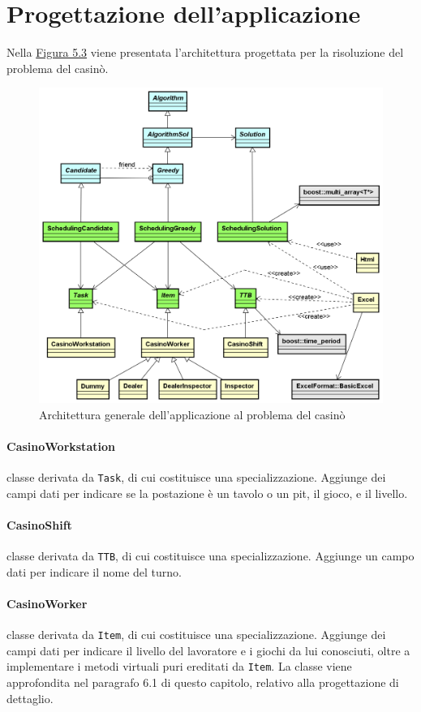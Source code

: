 \section{Progettazione dell'applicazione}
Nella \hyperref[fig53]{Figura 5.3} viene presentata l'architettura progettata per la risoluzione del problema del casinò.
\begin{figure}[!h]
    \label{fig53}
    \begin{widepage}
        \includegraphics[width=14.9cm,keepaspectratio]{../immagini/progettazione/applicazione.png}
        \caption{Architettura generale dell'applicazione al problema del casinò}
    \end{widepage}
\end{figure}
\FloatBarrier
\noindent
\paragraph{CasinoWorkstation} classe derivata da \texttt{Task}, di cui costituisce una specializzazione. Aggiunge dei campi dati per indicare se la postazione è un tavolo o un pit, il gioco, e il livello.
\paragraph{CasinoShift} classe derivata da \texttt{TTB}, di cui costituisce una specializzazione. Aggiunge un campo dati per indicare il nome del turno.
\paragraph{CasinoWorker} classe derivata da \texttt{Item}, di cui costituisce una specializzazione. Aggiunge dei campi dati per indicare il livello del lavoratore e i giochi da lui conosciuti, oltre a implementare i metodi virtuali puri ereditati da \texttt{Item}. La classe viene approfondita nel paragrafo 6.1 di questo capitolo, relativo alla progettazione di dettaglio.
